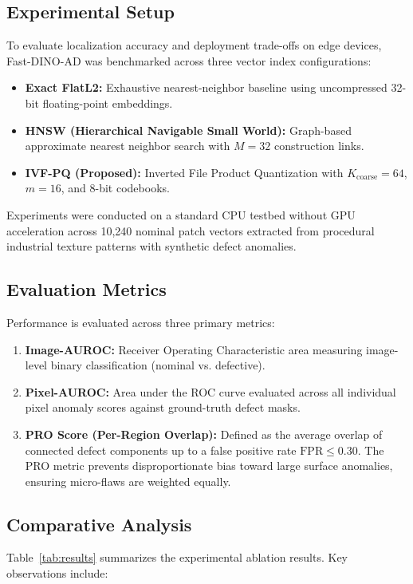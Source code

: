 \documentclass[10pt,journal,compsoc]{IEEEtran}
\begin{document}
\subsection{Experimental Setup}
To evaluate localization accuracy and deployment trade-offs on edge devices, Fast-DINO-AD was benchmarked across three vector index configurations:
\begin{itemize}
    \item \textbf{Exact FlatL2:} Exhaustive nearest-neighbor baseline using uncompressed 32-bit floating-point embeddings.
    \item \textbf{HNSW (Hierarchical Navigable Small World):} Graph-based approximate nearest neighbor search with $M=32$ construction links.
    \item \textbf{IVF-PQ (Proposed):} Inverted File Product Quantization with $K_{\text{coarse}}=64$, $m=16$, and 8-bit codebooks.
\end{itemize}

Experiments were conducted on a standard CPU testbed without GPU acceleration across 10,240 nominal patch vectors extracted from procedural industrial texture patterns with synthetic defect anomalies.

\subsection{Evaluation Metrics}
Performance is evaluated across three primary metrics:
\begin{enumerate}
    \item \textbf{Image-AUROC:} Receiver Operating Characteristic area measuring image-level binary classification (nominal vs. defective).
    \item \textbf{Pixel-AUROC:} Area under the ROC curve evaluated across all individual pixel anomaly scores against ground-truth defect masks.
    \item \textbf{PRO Score (Per-Region Overlap):} Defined as the average overlap of connected defect components up to a false positive rate $\text{FPR} \le 0.30$. The PRO metric prevents disproportionate bias toward large surface anomalies, ensuring micro-flaws are weighted equally.
\end{enumerate}

\subsection{Comparative Analysis}
Table~\ref{tab:results} summarizes the experimental ablation results. Key observations include:
\end{document}
